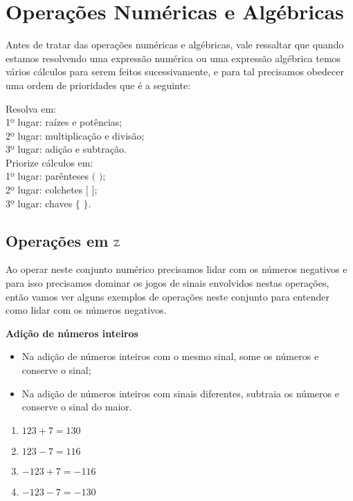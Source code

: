  \chapter{Operações Numéricas e Algébricas}
 
 Antes de tratar das operações numéricas e algébricas, vale ressaltar que quando estamos resolvendo uma expressão numérica ou uma expressão algébrica temos vários cálculos para serem feitos sucessivamente, e para tal precisamos obedecer uma ordem de prioridades que é a seguinte:
 
 \begin{multicols}{2}
 Resolva em: \\
 1º lugar: raízes e potências;\\
 2º lugar: multiplicação e divisão;\\
 3º lugar: adição e subtração.\\
 
 Priorize cálculos em:\\
 1º lugar: parênteses $($ $)$;\\
 2º lugar: colchetes $[$ $]$;\\
 3º lugar: chaves $\{$ $\}$.
 \end{multicols}
 
 \section{Operações em \texorpdfstring{$\mathbb{Z}$}{Z}}
 
 Ao operar neste conjunto numérico precisamos lidar com os números negativos e para isso precisamos dominar os jogos de sinais envolvidos nestas operações, então vamos ver alguns exemplos de operações neste conjunto para entender como lidar com os números negativos.
 
 \textbf{Adição de números inteiros}
 
 \begin{itemize}
  \item Na adição de números inteiros com o mesmo sinal, some os números e conserve o sinal;
  \item Na adição de números inteiros com sinais diferentes, subtraia os números e conserve o sinal do maior.
 \end{itemize}

  \begin{enumerate}[1)]
   \item $123 + 7= 130$
   \item $123 - 7= 116$
   \item $-123 + 7 = -116$
   \item $-123 - 7 = -130$
 \end{enumerate}

